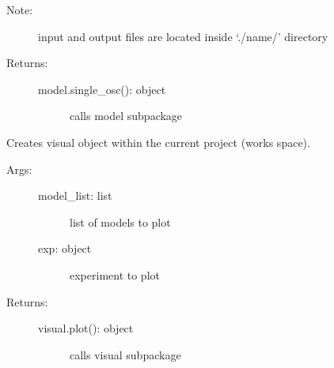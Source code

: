 \documentclass[letterpaper,10pt,english]{sphinxmanual}
\begin{document}
\begin{fulllineitems}
\begin{fulllineitems}
\begin{description}
\begin{description}
\end{description}

\item[{Note:}] \leavevmode
input and output files are located inside  ‘./name/’ directory

\item[{Returns:}] \leavevmode\begin{description}
\item[{model.single\_osc(): object}] \leavevmode
calls model sub\sphinxhyphen{}package

\end{description}

\end{description}

\end{fulllineitems}


\begin{fulllineitems}
\label{\detokenize{modules/main:phlab.rixs.visual}}
Creates visual object within the current project (works space).
\begin{description}
\item[{Args:}] \leavevmode\begin{description}
\item[{model\_list:  list}] \leavevmode
list of models to plot

\item[{exp: object}] \leavevmode
experiment to plot

\end{description}

\item[{Returns:}] \leavevmode\begin{description}
\item[{visual.plot():  object}] \leavevmode
calls visual sub\sphinxhyphen{}package

\end{description}

\end{description}

\end{fulllineitems}


\end{fulllineitems}
\end{document}
